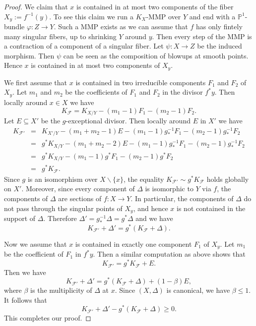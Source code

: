 \documentclass[12pt]{amsart}
\newcommand{\<}{\leq}
\def\>{\geq}
\def\subset{\subseteq}
\newcommand{\D}{\Delta}
\def\mcF{\mathcal{F}}
\theoremstyle{remark}
\theoremstyle{definition}
\theoremstyle{definition}
\numberwithin{equation}{section}
\theoremstyle{definition}
\theoremstyle{definition}
\begin{document}
\begin{proof} 
We claim that $x$ is contained in at most two components of the fiber $X_y := f^{-1}(y)$. To see this claim we   run a $K_X$-MMP over $Y$  and end with a $\mathbb{P}^1$-bundle $\varphi:Z\to Y$.  
Such a MMP exists as we can assume that $f$ has only fintely many singular fibers, up to shrinking $Y$ around $y$. 
Then every step of the MMP is a   contraction of a component of a singular fiber. 
Let $\psi:X\to Z$ be the induced morphism. Then $\psi$ can be seen as the composition of  blowups  at smooth points. 
Hence $x$ is contained in at most two components of $X_y$. 

We first assume that $x$ is contained in   two irreducible components $F_1$ and $F_2$ of $X_y$. 
Let $m_1$ and $m_2$ be the coefficients of $F_1$ and $F_2$  in the  divisor  $f^*y$. 
Then locally around $x\in X$ we have
\[K_{\mcF}=K_{X/Y} - (m_1-1)F_1 -(m_2-1)F_2.\]
Let $E\subset X'$ be the $g$-exceptional divisor. 
 Then locally around $E$ in $X'$ we have 
\begin{eqnarray*}
K_{\mcF'} &=&  K_{X'/Y}-(m_1+m_2-1)E - (m_1-1)g_*^{-1}F_1 -(m_2-1)g_*^{-1}F_2\\
         &=& g^*K_{X/Y} -(m_1+m_2-2)E - (m_1-1)g_*^{-1}F_1 -(m_2-1)g_*^{-1}F_2\\
         &=& g^*K_{X/Y} - (m_1-1)g^* F_1 -(m_2-1)g^* F_2\\
         &=& g^*K_{\mcF}. 
\end{eqnarray*} Since $g$ is an isomorphism over $X\backslash \{x\}$, the equality $K_{\mcF'} \sim g^*K_{\mcF}$ holds  globally on $X'$. Moreover, since every component of $\D$ is isomorphic to $Y$ via $f$, the components of $\Delta$ are sections of $f:X\to Y$. 
In particular, the components of $\Delta$ do not pass through the singular points of   $X_y$, 
and hence $x$ is not contained in the support of $\Delta$. 
Therefore $\Delta'=g^{-1}_*\D=g^*\Delta$ and  we have 
\[K_{\mcF'}+ \D'=g^*(K_{\mcF}+\D).\]

Now we assume that $x$ is contained in exactly one component $F_1$ of $X_y$. Let $m_1$ be the coefficient of $F_1$ in $f^*y$. Then a similar computation as above shows that 
\[K_{\mcF'}=g^*K_{\mcF}+E.\] 
Then we have  
\[K_{\mcF'}+ \D'=g^*(K_{\mcF}+\D) + ({1-\beta}) E,\]
where $\beta$ is the multiplicity of $\D$ at $x$. Since $(X,\D)$ is canonical, we have $\beta \< 1$. 
It follows that  \[K_{\mcF'}+ \D' - g^*(K_{\mcF}+\D)  \> 0.\]
This completes our proof.
\end{proof} 
\end{document}
